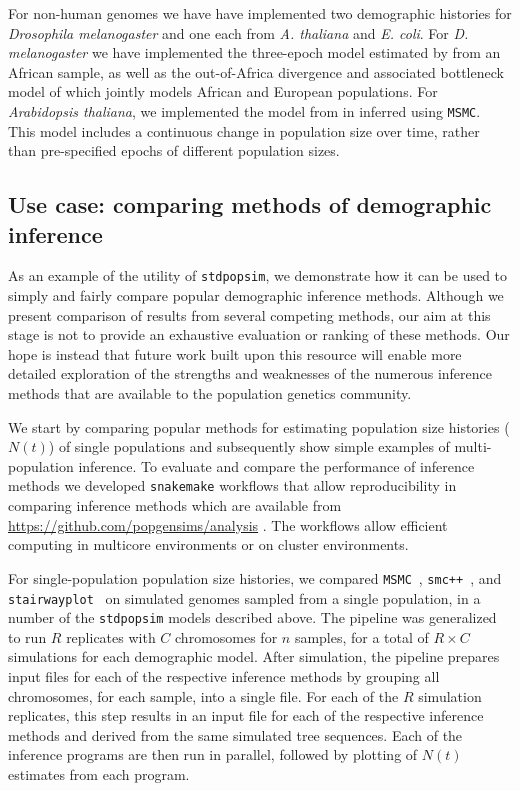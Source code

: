 \documentclass[12pt,halfline,a4paper]{ouparticle}
\newcommand{\stdpopsim}{\texttt{stdpopsim}\xspace}
\newcommand{\MSMC}{\texttt{MSMC}\xspace}
\newcommand{\smcpp}{\texttt{smc++}\xspace}
\newcommand{\stairwayplot}{\texttt{stairwayplot}\xspace}
\begin{document}
For non-human genomes we have have implemented two demographic histories for
\emph{Drosophila melanogaster} and one each from \emph{A. thaliana} and \emph{E. coli}.
For \emph{D. melanogaster} we have implemented the three-epoch model estimated by \cite{sheehan2016deep} from
an African sample, as well as the out-of-Africa divergence
and associated bottleneck model of \cite{li2006inferring} which jointly models African
and European populations. For \emph{Arabidopsis thaliana}, we implemented the
model from in \cite{durvasula2017african} inferred using \MSMC. This model includes
a continuous change in population size over time, rather than pre-specified epochs of different
population sizes.


\subsection*{Use case: comparing methods of demographic inference}
As an example of the utility of \stdpopsim, we demonstrate how it can be used 
to simply and fairly compare popular demographic inference methods.
Although we present comparison of results from several
competing methods, our aim at this stage is not to provide an exhaustive
evaluation or ranking of these methods. Our hope is instead that future work built upon this resource
will enable more detailed exploration of the strengths and weaknesses of the numerous
inference methods that are available to the population genetics community.

We start by comparing popular methods for estimating
population size histories ($N(t)$) of single populations and subsequently
show simple examples of multi-population inference.
To evaluate and compare the performance of inference methods we developed
\texttt{snakemake} \citep{koster2012snakemake} workflows that allow reproducibility
in comparing inference methods which are available from \url{https://github.com/popgensims/analysis}
. The workflows allow efficient computing in multicore environments or on
cluster environments.

For single-population population size histories, we compared
\MSMC~\citep{schiffels2014inferring}, \smcpp~\citep{terhorst2017robust}, and
\stairwayplot~\citep{liu2015exploring}
 on simulated genomes sampled from a single population,
in a number of the \stdpopsim models described above. The pipeline was generalized to
run $R$ replicates with $C$ chromosomes for $n$ samples, for a total of $R \times C$
simulations for each demographic model. After simulation, the pipeline prepares
input files for each of the respective inference methods by grouping all
chromosomes, for each sample, into a single file. For each of the $R$ simulation replicates, this step results in an
input file for each of the
respective inference methods and derived from the same simulated tree sequences.
Each of the inference programs are then run in parallel, followed by plotting of
$N(t)$ estimates from each program.
\end{document}
